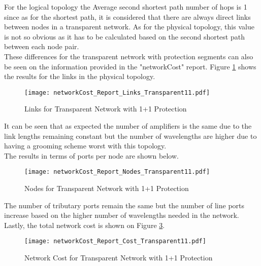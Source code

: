 \documentclass[12pt, a4paper]{article}
\begin{document}
		For the logical topology the Average second shortest path number of hops is 1 since as for the shortest path, it is considered that there are always direct links between nodes in a transparent network. As for the physical topology, this value is not so obvious as it has to be calculated based on the second shortest path between each node pair. \\
		
			
	
			
		These differences for the transparent network with protection segments can also be seen on the information provided in the "networkCost" report. Figure \ref{networkCost_Report_Links_Transparent11} shows the results for the links in the physical topology.\\
		
		\begin{figure}[!h]
			\centering
			\texttt{[image: networkCost\_Report\_Links\_Transparent11.pdf]}
			\caption{Links for Transparent Network with 1+1 Protection}
			\label{networkCost_Report_Links_Transparent11}						
		\end{figure}	
		
		It can be seen that as expected the number of amplifiers is the same due to the link lengths remaining constant but the number of wavelengths are higher due to having a grooming scheme worst with this topology.\\
		\newpage
		The results in terms of ports per node are shown below.
		
		\begin{figure}[!h]
			\centering
			\texttt{[image: networkCost\_Report\_Nodes\_Transparent11.pdf]}
			\caption{Nodes for Transparent Network with 1+1 Protection}
			\label{networkCost_Report_Nodes_Transparent11}						
		\end{figure}
		
		 The number of tributary ports remain the same but the number of line ports increase based on the higher number of wavelengths needed in the network.\\
		
		Lastly, the total network cost is shown on Figure \ref{networkCost_Report_Cost_Transparent11}.\\
		
		
		\begin{figure}[!h]
			\centering
			\texttt{[image: networkCost\_Report\_Cost\_Transparent11.pdf]}	
			\caption{Network Cost for Transparent Network with 1+1 Protection}
			\label{networkCost_Report_Cost_Transparent11}								
		\end{figure}		
		
\end{document}
